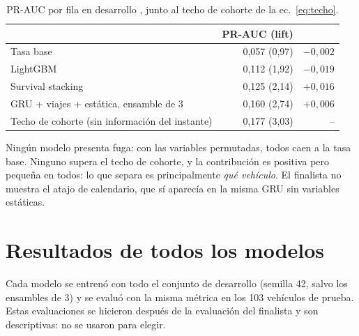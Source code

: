 \begin{table}[!htbp]
\centering
\caption{PR-AUC por fila en desarrollo \tagdev{}, junto al techo de cohorte de la ec.~\eqref{eq:techo}.}
\label{tab:prauc}
\begin{tabular}{@{}lrr@{}}
\toprule
 & PR-AUC (lift) & \aprime{} \\
\midrule
Tasa base & 0,057 (0,97) & $-0{,}002$ \\
LightGBM & 0,112 (1,92) & $-0{,}019$ \\
Survival stacking & 0,125 (2,14) & $+0{,}016$ \\
GRU + viajes + estática, ensamble de 3 & 0,160 (2,74) & $+0{,}006$ \\
Techo de cohorte (sin información del instante) & 0,177 (3,03) & -- \\
\bottomrule
\end{tabular}
\end{table}

Ningún modelo presenta fuga: con las variables permutadas, todos caen a la tasa base. Ninguno supera el techo de cohorte, y la
contribución \aprime{} es positiva pero pequeña en todos: lo que separa es principalmente \emph{qué vehículo}. El finalista no
muestra el atajo de calendario, que sí aparecía en la misma GRU sin variables estáticas.

\section{Resultados de todos los modelos}
\label{anx:modelos}

Cada modelo se entrenó con todo el conjunto de desarrollo (semilla 42, salvo los ensambles de 3) y se evaluó con la misma
métrica en los 103 vehículos de prueba. Estas evaluaciones se hicieron después de la evaluación del finalista y son
descriptivas: no se usaron para elegir.

\begin{table}[!htbp]
\centering
\caption{Detección $D(\alpha)$ (\%) en el conjunto de prueba según el presupuesto de falsas alarmas \tagtest{}. ``Prim.''
es $\bar D$, ec.~\eqref{eq:primario}.}
\label{tab:modelos-test}
\resizebox{\textwidth}{!}{}
\end{table}

\begin{table}[!htbp]
\centering
\caption{Con el umbral fijado en desarrollo \tagtest{}: detección y tasa de falsas alarmas realizada en prueba.}
\label{tab:operacion}

\end{table}

